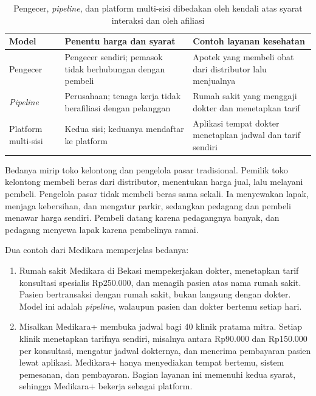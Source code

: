 \begin{table}[!htb]
  \centering
  \caption{Pengecer, \textit{pipeline}, dan platform multi-sisi dibedakan oleh
           kendali atas syarat interaksi dan oleh afiliasi}
  \label{tab:ch02-tiga-model}
  \begin{tabularx}{\textwidth}{lXX}
    \hline
    \textbf{Model} & \textbf{Penentu harga dan syarat} & \textbf{Contoh layanan kesehatan} \\
    \hline
    Pengecer & Pengecer sendiri; pemasok tidak berhubungan dengan pembeli & Apotek yang membeli obat dari distributor lalu menjualnya \\
    \hline
    \textit{Pipeline} & Perusahaan; tenaga kerja tidak berafiliasi dengan pelanggan & Rumah sakit yang menggaji dokter dan menetapkan tarif \\
    \hline
    Platform multi-sisi & Kedua sisi; keduanya mendaftar ke platform & Aplikasi tempat dokter menetapkan jadwal dan tarif sendiri \\
    \hline
  \end{tabularx}
\end{table}

Bedanya mirip toko kelontong dan pengelola pasar tradisional. Pemilik toko
kelontong membeli beras dari distributor, menentukan harga jual, lalu melayani
pembeli. Pengelola pasar tidak membeli beras sama sekali. Ia menyewakan lapak,
menjaga kebersihan, dan mengatur parkir, sedangkan pedagang dan pembeli
menawar harga sendiri. Pembeli datang karena pedagangnya banyak, dan pedagang
menyewa lapak karena pembelinya ramai.

Dua contoh dari Medikara memperjelas bedanya:
\begin{enumerate}
  \item Rumah sakit Medikara di Bekasi mempekerjakan dokter, menetapkan tarif
        konsultasi spesialis Rp250.000, dan menagih pasien atas nama rumah
        sakit. Pasien bertransaksi dengan rumah sakit, bukan langsung dengan
        dokter. Model ini adalah \textit{pipeline}, walaupun pasien dan dokter
        bertemu setiap hari.
  \item Misalkan Medikara+ membuka jadwal bagi 40 klinik pratama mitra. Setiap
        klinik menetapkan tarifnya sendiri, misalnya antara Rp90.000 dan
        Rp150.000 per konsultasi, mengatur jadwal dokternya, dan menerima
        pembayaran pasien lewat aplikasi. Medikara+ hanya menyediakan tempat
        bertemu, sistem pemesanan, dan pembayaran. Bagian layanan ini memenuhi
        kedua syarat, sehingga Medikara+ bekerja sebagai platform.
\end{enumerate}

